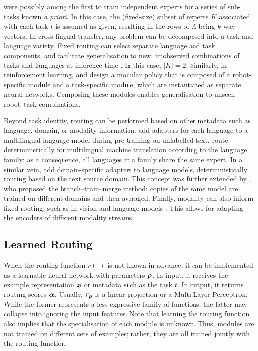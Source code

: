 \documentclass[10pt]{article} %
\begin{document}
\citet{hampshire1992meta} were possibly among the first to train independent experts for a series of sub-tasks known \textit{a priori}. In this case, the (fixed-size) subset of experts $K$ associated with each task $t$ is assumed as given, resulting in the rows of $A$ being $k$-way vectors.  
In cross-lingual transfer, any problem can be decomposed into a task and language variety. Fixed routing can select separate language and task components, and facilitate generalisation to new, unobserved combinations of tasks and languages at inference time \citep{pfeiffer-etal-2020-mad,ponti-etal-2021-parameter,Ustun:2022hyperx}. In this case, $|K| = 2$. Similarly, in reinforcement learning, \citet{heess2016learning} and \citet{devin2017learning} design a modular policy that is composed of a robot-specific module and a task-specific module, which are instantiated as separate neural networks. Composing these modules enables generalisation to unseen robot--task combinations.

Beyond task identity, routing can be performed based on other metadata such as language, domain, or modality information. 
\cite{Pfeiffer2022Lifting} add adapters for each language to a multilingual language model during pre-training on unlabelled text. \citet{Fan2021Beyond} route deterministically for multilingual machine translation according to the language family: as a consequence, all languages in a family share the same expert. In a similar vein, \cite{Gururangan2022Demix} add domain-specific adapters to language models, deterministically routing based on the text source domain. This concept was further extended by \citet{Li2022BranchTrainMerge}, who proposed the branch--train--merge method: copies of the same model are trained on different domains and then averaged. Finally, modality can also inform fixed routing, such as in vision-and-language models \citep{pfeiffer-etal-2022-xgqa}. This allows for adapting the encoders of different modality streams.
 

\subsection{Learned Routing}
\label{sec:routing:learned}

When the routing function $r(\cdot)$ is not known in advance, it can be implemented as a learnable neural network with parameters ${\bm{\rho}}$. In input, it receives the example representation ${\bm{x}}$ or metadata such as the task $t$. In output, it returns routing scores ${\bm{\alpha}}$. Usually, $r_{\bm{\rho}}$ is a linear projection or a Multi-Layer Perceptron. While the former represents a less expressive family of functions, the latter may collapse into ignoring the input features. Note that learning the routing function also implies that the specialisation of each module is unknown. Thus, modules are not trained on different sets of examples; rather, they are all trained jointly with the routing function.
\end{document}
